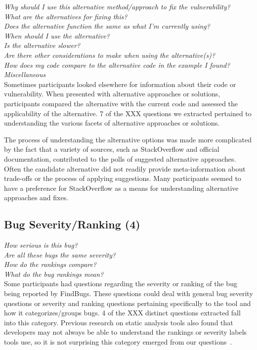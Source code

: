 \documentclass[conference]{IEEEtran}
\begin{document}
\noindent\emph{Why should I use this alternative method/approach to fix the vulnerability?} \\
\emph{What are the alternatives for fixing this?} \\
\emph{Does the alternative function the same as what I'm currently using?} \\
\emph{When should I use the alternative?} \\
\emph{Is the alternative slower?} \\
\emph{Are there other considerations to make when using the alternative(s)?} \\
\emph{How does my code compare to the alternative code in the example I found?} \\
\emph{Miscellaneous} \\

Sometimes participants looked elsewhere for information about their code or vulnerability. When presented with alternative approaches or solutions, participants compared the alternative with the current code and assessed the applicability of the alternative. 7 of the XXX questions we extracted pertained to understanding the various facets of alternative approaches or solutions.   

The process of understanding the alternative options was made more complicated by the fact that a variety of sources, such as StackOverflow and official documentation, contributed to the polls of suggested alternative approaches. Often the candidate alternative did not readily provide meta-information about trade-offs or the process of applying suggestions. Many participants seemed to have a preference for StackOverflow as a means for understanding alternative approaches and fixes. 


\noindent\subsection{\textbf{Bug Severity/Ranking (4)}}

\noindent\emph{How serious is this bug?} \\
\emph{Are all these bugs the same severity?} \\
\emph{How do the rankings compare?} \\
\emph{What do the bug rankings mean?} \\

Some participants had questions regarding the severity or ranking of the bug being reported by FindBugs. These questions could deal with general bug severity questions or severity and ranking questions pertaining specifically to the tool and how it categorizes/groups bugs. 4 of the XXX distinct questions extracted fall into this category. Previous research on static analysis tools also found that developers may not always be able to understand the rankings or severity labels tools use, so it is not surprising this category emerged from our questions~\cite{johnson2013don}.
\end{document}
